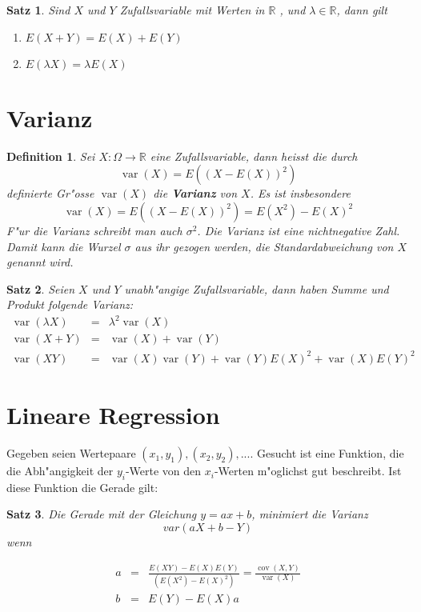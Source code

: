 \documentclass[ngerman, a4paper, 10pt, twocolumn, DIV20, headings=small]{scrartcl}
\newtheorem{definition}{Definition}
\newtheorem{satz}{Satz}
\begin{document}
\begin{satz}
\label{rechenregeln-erwartungswert}
Sind $X$ und $Y$ Zufallsvariable mit Werten in $\mathbb{R}$ ,
und $\lambda\in\mathbb{R}$, dann gilt
\begin{enumerate}
\item $E(X+Y)=E(X)+E(Y)$
\item $E(\lambda X)=\lambda E(X)$

\end{enumerate}
\end{satz}

\section{Varianz}
\label{sec:varianz}

\begin{definition}
Sei $X\colon\Omega\to\mathbb{R}$ eine Zufallsvariable, dann
heisst die durch 
\[
\operatorname{var}(X)=E((X-E(X))^2)
\]
 definierte Gr"osse $\operatorname{var}(X)$ die
{\bf Varianz} von $X$. Es ist insbesondere
\[
\operatorname{var}(X)=E((X-E(X))^2)=E(X^2)-E(X)^2
\]
F"ur die Varianz schreibt man auch $\sigma^2$. Die Varianz ist eine nichtnegative Zahl. Damit kann die Wurzel $\sigma$ aus ihr gezogen werden, die Standardabweichung von $X$ genannt wird.

\end{definition}

\begin{satz}
\label{rechenregeln-varianz}
Seien $X$ und $Y$ unabh"angige Zufallsvariable, dann haben
Summe und Produkt folgende Varianz:
\begin{eqnarray*}
\operatorname{var}(\lambda X)&=&\lambda^2\operatorname{var}(X)\\
\operatorname{var}(X+Y)&=&\operatorname{var}(X)+\operatorname{var}(Y)\\
\operatorname{var}(XY)&=&\operatorname{var}(X)\operatorname{var}(Y)
+
\operatorname{var}(Y)E(X)^2+\operatorname{var}(X)E(Y)^2
\end{eqnarray*}
\end{satz}

\section{Lineare Regression}
\label{sec:lineareregression}

Gegeben seien Wertepaare $(x_1, y_1), (x_2, y_2), ...$. Gesucht ist eine Funktion, die die Abh"angigkeit der $y_i$-Werte von den $x_i$-Werten m"oglichst gut beschreibt. Ist diese Funktion die Gerade gilt:
\begin{satz}
  Die Gerade mit der Gleichung $y = ax + b$, minimiert die Varianz
\[
var(aX + b - Y)
\]
wenn

\begin{eqnarray*}
a&=&\frac{E(XY)-E(X)E(Y)}{(E(X^2)-E(X)^2)}=\frac{\operatorname{cov}(X,Y)}{\operatorname{var}(X)}\\
b&=&E(Y)-E(X)a
\end{eqnarray*}

\end{satz}
\end{document}
